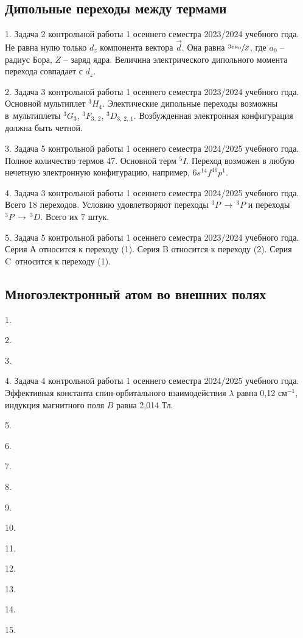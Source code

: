 \par
\newpage

\subsection{Дипольные переходы между термами}
1. Задача 2 контрольной работы 1 осеннего семестра 2023/2024 учебного года. Не равна нулю только $d_z$ компонента вектора $\vec d$. Она равна $\sfrac{3ea_0}{Z}$, где $a_0$ – радиус Бора, $Z$ – заряд ядра. Величина электрического дипольного момента перехода совпадает с $d_z$.\par
2. Задача 3 контрольной работы 1 осеннего семестра 2023/2024 учебного года. Основной мультиплет $^3H_4$. Электические дипольные переходы возможны в~мультиплеты $^3G_3$, $^3F_{3,\,2}$, $^3D_{3,\,2,\,1}$. Возбужденная электронная конфигурация должна быть четной.\par
3. Задача 5 контрольной работы 1 осеннего семестра 2024/2025 учебного года.  Полное количество термов 47. Основной терм $^5I$. Переход возможен в любую нечетную электронную конфигурацию, например, $6s^14f^46p^1$.\par
4. Задача 3 контрольной работы 1 осеннего семестра 2024/2025 учебного года. Всего 18 переходов. Условию удовлетворяют переходы $^3P\, \rightarrow\, ^3P$ и переходы $^3P\, \rightarrow\, ^3D$. Всего их 7 штук.\par
5. Задача 5 контрольной работы 1 осеннего семестра 2023/2024 учебного года. Серия А относится к переходу (1). Серия B относится к переходу (2). Серия C~относится к переходу (1).   \\
\newpage

\subsection{Многоэлектронный атом во внешних полях}
1. \par
2. \par
3. \par
4. Задача 4 контрольной работы 1 осеннего семестра 2024/2025 учебного года. Эффективная константа спин-орбитального взаимодействия $\lambda$ равна 0,12 см$^{-1}$, индукция магнитного поля $B$ равна 2,014 Тл.\par
5. \par
6. \par
7. \par
8. \par
9. \par
10. \par
11. \par
12. \par
13. \par
14. \par
15. \par
\newpage

